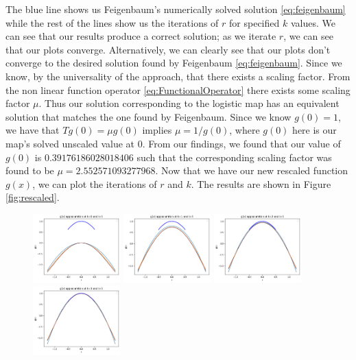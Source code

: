 \begin{exmp}
    The blue line shows us Feigenbaum's numerically solved solution \eqref{eq:feigenbaum} while the rest of the lines show us the iterations of $r$ for specified $k$ values. 
	We can see that our results produce a correct solution; as we iterate $r$, we can see that our plots converge. Alternatively, we can clearly see that our plots don't converge to the desired solution found by Feigenbaum \eqref{eq:feigenbaum}. Since we know, by the universality of the approach, that there exists a scaling factor. From the non linear function operator \eqref{eq:FunctionalOperator} there exists some scaling factor $\mu$. Thus our solution corresponding to the logistic map has an equivalent solution that matches the one found by Feigenbaum. Since we know $g(0)=1$, we have that $Tg(0)=\mu g(0)$ implies $\mu = 1/g(0)$, where $g(0)$ here is our map's solved unscaled value at 0. From our findings, we found that our value of $g(0)$ is $0.39176186028018406$ such that the corresponding scaling factor was found to be $\mu= 2.552571093277968$. Now that we have our new rescaled function $g(x)$, we can plot the iterations of $r$ and $k$. The results are shown in Figure \ref{fig:rescaled}.
    \begin{figure}
    \centering
    \includegraphics[width=0.3\textwidth]{Feigenbaum Approx Graphs/k=0.png}
    \includegraphics[width=0.3\textwidth]{Feigenbaum Approx Graphs/k=1.png}
    \includegraphics[width=0.3\textwidth]{Feigenbaum Approx Graphs/k=2.png}
    \\
    \includegraphics[width=0.3\textwidth]{Feigenbaum Approx Graphs/k=3.png}

\end{figure}
\end{exmp}

